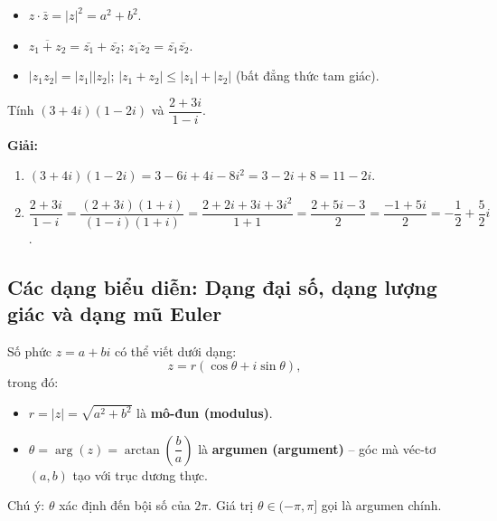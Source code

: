 \documentclass[12pt,a4paper]{article}
\begin{document}
\begin{tinhchat}
  \begin{itemize}
    \item $z \cdot \bar{z} = |z|^2 = a^2 + b^2$.
    \item $\overline{z_1 + z_2} = \bar{z_1} + \bar{z_2}$; $\overline{z_1 z_2} = \bar{z_1}\bar{z_2}$.
    \item $|z_1 z_2| = |z_1||z_2|$; $|z_1 + z_2| \le |z_1| + |z_2|$ (bất đẳng thức tam giác).
  \end{itemize}
\end{tinhchat}

\begin{vidu}
  Tính $(3 + 4i)(1 - 2i)$ và $\dfrac{2+3i}{1-i}$.

  \medskip\textbf{Giải:}
  \begin{enumerate}[label=(\alph*)]
    \item $(3+4i)(1-2i) = 3 - 6i + 4i - 8i^2 = 3 - 2i + 8 = 11 - 2i$.
    \item $\dfrac{2+3i}{1-i} = \dfrac{(2+3i)(1+i)}{(1-i)(1+i)} = \dfrac{2+2i+3i+3i^2}{1+1} = \dfrac{2+5i-3}{2} = \dfrac{-1+5i}{2} = -\dfrac{1}{2} + \dfrac{5}{2}i$.
  \end{enumerate}
\end{vidu}

\subsection{Các dạng biểu diễn: Dạng đại số, dạng lượng giác và dạng mũ Euler}

\begin{dinhnghia}[title={Dạng lượng giác (Trigonometric Form)}]
  Số phức $z = a + bi$ có thể viết dưới dạng:
  \[
    z = r(\cos\theta + i\sin\theta),
  \]
  trong đó:
  \begin{itemize}
    \item $r = |z| = \sqrt{a^2 + b^2}$ là \textbf{mô-đun (modulus)}.
    \item $\theta = \arg(z) = \arctan\!\left(\dfrac{b}{a}\right)$ là \textbf{argumen (argument)} -- góc mà véc-tơ $(a,b)$ tạo với trục dương thực.
  \end{itemize}
  Chú ý: $\theta$ xác định đến bội số của $2\pi$. Giá trị $\theta \in (-\pi, \pi]$ gọi là argumen chính.
\end{dinhnghia}
\end{document}
